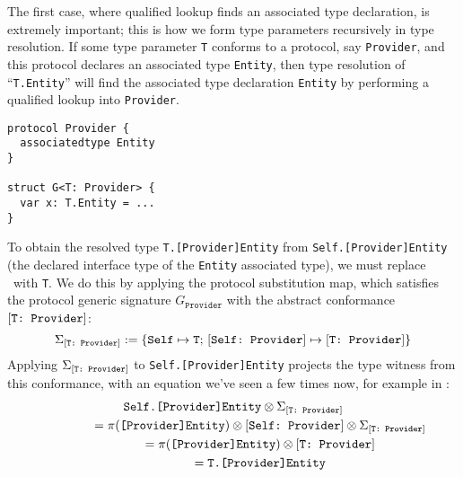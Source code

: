 \documentclass[../generics]{subfiles}
\begin{document}
The first case, where qualified lookup finds an associated type declaration, is extremely important; this is how we form type parameters recursively in type resolution. If some type parameter \texttt{T} conforms to a protocol, say \texttt{Provider}, and this protocol declares an associated type \texttt{Entity}, then type resolution of ``\texttt{T.Entity}'' will find the associated type declaration \texttt{Entity} by performing a qualified lookup into \texttt{Provider}.
\begin{Verbatim}
protocol Provider {
  associatedtype Entity
}

struct G<T: Provider> {
  var x: T.Entity = ...
}
\end{Verbatim}
To obtain the resolved type \texttt{T.[Provider]Entity} from \texttt{Self.[Provider]Entity} (the declared interface type of the \texttt{Entity} associated type), we must replace \tSelf\ with \texttt{T}. We do this by applying the protocol substitution map, which satisfies the protocol generic signature $G_\texttt{Provider}$ with the abstract conformance $[\texttt{T:~Provider}]$: \[\Sigma_{[\texttt{T:~Provider}]}:=\{\texttt{Self} \mapsto \texttt{T};\,[\texttt{Self:~Provider}] \mapsto [\texttt{T:~Provider}]\}\]
Applying $\Sigma_{[\texttt{T:~Provider}]}$ to \texttt{Self.[Provider]Entity} projects the type witness from this conformance, with an equation we've seen a few times now, for example in :
\begin{gather*}
\texttt{Self.[Provider]Entity}\otimes\Sigma_{[\texttt{T:~Provider}]}\\
\qquad\qquad{}=\pi(\texttt{[Provider]Entity})\otimes[\texttt{Self:~Provider}]\otimes\Sigma_{[\texttt{T:~Provider}]}\\
\qquad\qquad{}=\pi(\texttt{[Provider]Entity})\otimes[\texttt{T:~Provider}]\\
\qquad\qquad{}=\texttt{T.[Provider]Entity}
\end{gather*}
\end{document}
